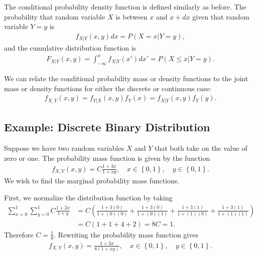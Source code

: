 The conditional probability density function is defined similarly as before. The probability that random variable $X$ is between $x$ and $x + dx$ given that random variable $Y = y$ is
\begin{align}
  f_{X|Y}(x,y) dx = P( X = x | Y = y ) ,
\end{align}
and the cumulative distribution function is
\begin{align}
  F_{X|Y}(x,y) = \int_{-\infty}^x f_{X|Y}(x') dx' = P( X \le x | Y = y ) .
\end{align}

We can relate the conditional probability mass or density functions to the joint mass or density functions for either the discrete or continuous case:
\begin{align}
  f_{X,Y}(x,y) = f_{Y|X}(x,y) f_Y(x) = f_{X|Y}(x,y) f_Y(y) .
\end{align}


\subsection{Example: Discrete Binary Distribution}

Suppose we have two random variables $X$ and $Y$ that both take on the value of zero or one. The probability mass function is given by the function
\begin{align}
  f_{X,Y}(x,y) = C \frac{ 1 + 3x }{ 1 + xy }, \quad x \in \left\{ 0, 1 \right\}, \quad y \in \left\{ 0, 1 \right\} .
\end{align}
We wish to find the marginal probability mass functions.

First, we normalize the distribution function by taking
\begin{align}
  \sum_{x=0}^1 \sum_{y=0}^1 C \frac{ 1 + 2x }{ 1 + y } &= 
  C \left( \frac{ 1 + 3(0) }{ 1 + (0)(0) } + \frac{ 1 + 3(0) }{ 1 + (0)(1) } + \frac{ 1 + 3(1) }{ 1 + (1)(0) } + \frac{ 1 + 3(1) }{ 1 + (1)(1) } \right) \nonumber \\
  &= C \left( 1 + 1 + 4 + 2 \right) = 8 C = 1 .
\end{align}
Therefore $C = \tfrac{1}{8}$. Rewriting the probability mass function gives
\begin{align}
  f_{X,Y}(x,y) = \frac{ 1 + 3x }{ 8 ( 1 + xy ) }, \quad x \in \left\{ 0, 1 \right\}, \quad y \in \left\{ 0, 1 \right\} .
\end{align}

